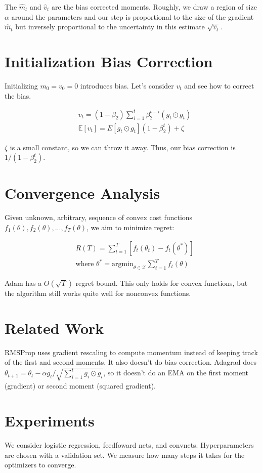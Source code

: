 \documentclass[a4paper]{article}
\begin{document}
The $\hat{m}_t$ and $\hat{v}_t$ are the bias corrected moments. Roughly,
we draw a region of size $\alpha$ around the parameters and our step
is proportional to the size of the gradient $\hat{m}_t$ but inversely
proportional to the uncertainty in this estimate $\sqrt{\hat{v}_t}$.

\section{Initialization Bias Correction}
Initializing $m_0 = v_0 = 0$ introduces bias. Let's consider $v_t$ and see
how to correct the bias.


\begin{align}
  & v_t = (1 - \beta_2) \sum_{i=1}^{t}{\beta_2^{t-i} (g_t \odot g_t)} \\
  & \mathbb{E}[v_t] = E[g_t \odot g_t] (1 - \beta_2^t)  + \zeta
\end{align}

$\zeta$ is a small constant, so we can throw it away. Thus, our bias correction
is $1/(1 - \beta_2^t)$.

\section{Convergence Analysis}
Given unknown, arbitrary, sequence of convex cost functions $f_1(\theta),
f_2(\theta), ..., f_T(\theta)$, we aim to minimize regret:

\begin{align}
  & R(T) = \sum_{t=1}^{T}{[f_t(\theta_t) - f_t(\theta^{*})]} \\
  & \text{where } \theta^{*} = \text{argmin}_{\theta \in \mathcal{X}}{
  \sum_{t=1}^{T}{f_t(\theta)}}
\end{align}

Adam has a $O(\sqrt{T})$ regret bound. This only holds for convex functions,
but the algorithm still works quite well for nonconvex functions.

\section{Related Work}
RMSProp uses gradient rescaling to compute momentum instead of keeping track
of the first and second moments. It also doesn't do bias correction. Adagrad
does $\theta_{t+1} = \theta_t - \alpha g_t / \sqrt{\sum_{i=1}^{t}{g_i \odot
g_i}}$, so it doesn't do an EMA on the first moment (gradient) or second moment
(squared gradient).

\section{Experiments}
We consider logistic regression, feedfoward nets, and convnets. Hyperparameters
are chosen with a validation set. We measure how many steps it takes for the
optimizers to converge.
\end{document}
